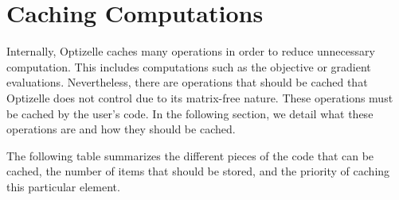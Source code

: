 \documentclass{report}
\newcommand{\seccaching}{Caching Computations}
\begin{document}
\section{\seccaching}\label{sec:caching}

    Internally, Optizelle caches many operations in order to reduce unnecessary computation.  This includes computations such as the objective or gradient evaluations.  Nevertheless, there are operations that should be cached that Optizelle does not control due to its matrix-free nature.  These operations must be cached by the user's code.  In the following section, we detail what these operations are and how they should be cached.

    The following table summarizes the different pieces of the code that can be cached, the number of items that should be stored, and the priority of caching this particular element. 
\end{document}
